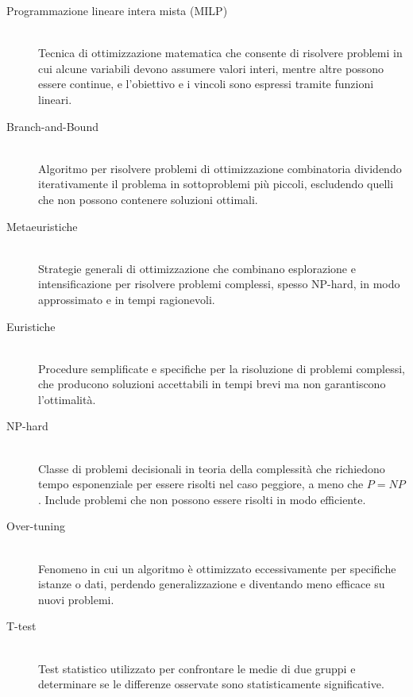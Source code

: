\begin{description}
    \item[Programmazione lineare intera mista (MILP)] \hfill \\
    Tecnica di ottimizzazione matematica che consente di risolvere problemi in cui alcune variabili devono assumere valori interi, mentre altre possono essere continue, e l'obiettivo e i vincoli sono espressi tramite funzioni lineari.

    \item[Branch-and-Bound] \hfill \\
    Algoritmo per risolvere problemi di ottimizzazione combinatoria dividendo iterativamente il problema in sottoproblemi più piccoli, escludendo quelli che non possono contenere soluzioni ottimali.

    \item[Metaeuristiche] \hfill \\
    Strategie generali di ottimizzazione che combinano esplorazione e intensificazione per risolvere problemi complessi, spesso NP-hard, in modo approssimato e in tempi ragionevoli.

    \item[Euristiche] \hfill \\
    Procedure semplificate e specifiche per la risoluzione di problemi complessi, che producono soluzioni accettabili in tempi brevi ma non garantiscono l'ottimalità.

    \item[NP-hard] \hfill \\
    Classe di problemi decisionali in teoria della complessità che richiedono tempo esponenziale per essere risolti nel caso peggiore, a meno che $P=NP$. Include problemi che non possono essere risolti in modo efficiente.

    \item[Over-tuning] \hfill \\
    Fenomeno in cui un algoritmo è ottimizzato eccessivamente per specifiche istanze o dati, perdendo generalizzazione e diventando meno efficace su nuovi problemi.

    \item[T-test] \hfill \\
    Test statistico utilizzato per confrontare le medie di due gruppi e determinare se le differenze osservate sono statisticamente significative.
\end{description}
